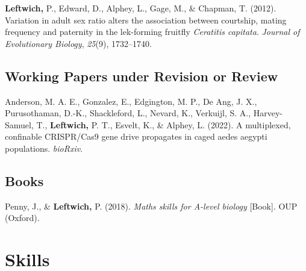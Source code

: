 \documentclass[11pt, a4paper]{awesome-cv}
\begin{document}
\leavevmode\hypertarget{ref-4}{}%
\textbf{Leftwich,} P., Edward, D., Alphey, L., Gage, M., \& Chapman, T.
(2012). Variation in adult sex ratio alters the association between
courtship, mating frequency and paternity in the lek-forming fruitfly
\emph{{Ceratitis} capitata}. \emph{Journal of Evolutionary Biology},
\emph{25}(9), 1732--1740.

\endgroup

\hypertarget{working-papers-under-revision-or-review}{%
\subsection{Working Papers under Revision or
Review}\label{working-papers-under-revision-or-review}}

\begingroup
\setlength{\parindent}{0.2in}

\hypertarget{refs_working_paper}{}
\leavevmode\hypertarget{ref-1}{}%
Anderson, M. A. E., Gonzalez, E., Edgington, M. P., De Ang, J. X.,
Purusothaman, D.-K., Shackleford, L., Nevard, K., Verkuijl, S. A.,
Harvey-Samuel, T., \textbf{Leftwich,} P. T., Esvelt, K., \& Alphey, L.
(2022). A multiplexed, confinable CRISPR/Cas9 gene drive propagates in
caged aedes aegypti populations. \emph{bioRxiv}.

\endgroup

\hypertarget{books}{%
\subsection{Books}\label{books}}

\begingroup
\setlength{\parindent}{0.2in}

\hypertarget{refs_proceedings}{}
\leavevmode\hypertarget{ref-1}{}%
Penny, J., \& \textbf{Leftwich,} P. (2018). \emph{Maths skills for
{A-level} biology} {[}Book{]}. OUP (Oxford).

\endgroup

\hypertarget{skills}{%
\section{Skills}\label{skills}}
\end{document}
